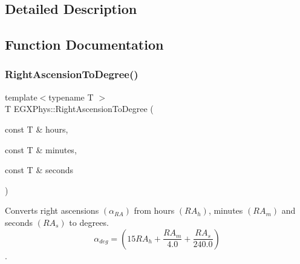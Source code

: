 \subsection{Detailed Description}


\subsection{Function Documentation}
\mbox{\label{group___e_g_x_phys-_astrophysics-_right_ascension_ga30e95e529dac871efc014c8ca0108c0d}} 
\subsubsection{\texorpdfstring{Right\+Ascension\+To\+Degree()}{RightAscensionToDegree()}}
{\footnotesize\ttfamily template$<$typename T $>$ \\
T E\+G\+X\+Phys\+::\+Right\+Ascension\+To\+Degree (\begin{DoxyParamCaption}\item[{const T \&}]{hours,  }\item[{const T \&}]{minutes,  }\item[{const T \&}]{seconds }\end{DoxyParamCaption})}



Converts right ascensions $(\alpha_{RA})$ from hours $(RA_h)$, minutes $(RA_m)$ and seconds $(RA_s)$ to degrees. \[\alpha_{deg}=(15 RA_h + \frac{RA_m}{4.0} + \frac{RA_s}{240.0})\]. 

